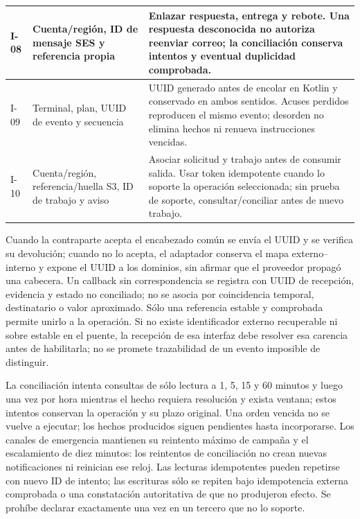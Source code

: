 \begin{longtable}{@{}L{.14\linewidth}L{.42\linewidth}L{\dimexpr.44\tabcolsep\relax}@{}}
I-08 & Cuenta/región, ID de mensaje SES y referencia propia & Enlazar respuesta, entrega y rebote. Una respuesta desconocida no autoriza reenviar correo; la conciliación conserva intentos y eventual duplicidad comprobada.\\ \hline
I-09 & Terminal, plan, UUID de evento y secuencia & UUID generado antes de encolar en Kotlin y conservado en ambos sentidos. Acuses perdidos reproducen el mismo evento; desorden no elimina hechos ni renueva instrucciones vencidas.\\ \hline
I-10 & Cuenta/región, referencia/huella S3, ID de trabajo y aviso & Asociar solicitud y trabajo antes de consumir salida. Usar token idempotente cuando lo soporte la operación seleccionada; sin prueba de soporte, consultar/conciliar antes de nuevo trabajo.\\ \hline
\end{longtable}

Cuando la contraparte acepta el encabezado común se envía el UUID y se verifica su devolución; cuando no lo acepta, el adaptador conserva el mapa externo--interno y expone el UUID a los dominios, sin afirmar que el proveedor propagó una cabecera. Un callback sin correspondencia se registra con UUID de recepción, evidencia y estado no conciliado; no se asocia por coincidencia temporal, destinatario o valor aproximado. Sólo una referencia estable y comprobada permite unirlo a la operación. Si no existe identificador externo recuperable ni sobre estable en el puente, la recepción de esa interfaz debe resolver esa carencia antes de habilitarla; no se promete trazabilidad de un evento imposible de distinguir.

La conciliación intenta consultas de sólo lectura a 1, 5, 15 y 60 minutos y luego una vez por hora mientras el hecho requiera resolución y exista ventana; estos intentos conservan la operación y su plazo original. Una orden vencida no se vuelve a ejecutar; los hechos producidos siguen pendientes hasta incorporarse. Los canales de emergencia mantienen su reintento máximo de campaña y el escalamiento de diez minutos: los reintentos de conciliación no crean nuevas notificaciones ni reinician ese reloj. Las lecturas idempotentes pueden repetirse con nuevo ID de intento; las escrituras sólo se repiten bajo idempotencia externa comprobada o una constatación autoritativa de que no produjeron efecto. Se prohíbe declarar exactamente una vez en un tercero que no lo soporte.

